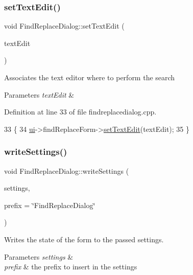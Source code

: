 \subsubsection{\texorpdfstring{set\+Text\+Edit()}{setTextEdit()}}
{\footnotesize\ttfamily void Find\+Replace\+Dialog\+::set\+Text\+Edit (\begin{DoxyParamCaption}\item[{Q\+Text\+Edit $\ast$}]{text\+Edit }\end{DoxyParamCaption})}

Associates the text editor where to perform the search 
\begin{DoxyParams}{Parameters}
{\em text\+Edit} & \\
\hline
\end{DoxyParams}


Definition at line 33 of file findreplacedialog.\+cpp.


\begin{DoxyCode}
33                                                        \{
34     \hyperlink{class_ui_1_1_find_replace_dialog_a29b7e2e415bc683d3dd089b366cccf4a}{ui}->findReplaceForm->\hyperlink{class_ui_1_1_find_replace_dialog_a3d3cd91477be5d6529e9aa3de21958a6}{setTextEdit}(textEdit);
35 \}
\end{DoxyCode}
\mbox{\label{class_ui_1_1_find_replace_dialog_ad9216d8059c559596baa5ddcbda3ec0b}} 
\subsubsection{\texorpdfstring{write\+Settings()}{writeSettings()}}
{\footnotesize\ttfamily void Find\+Replace\+Dialog\+::write\+Settings (\begin{DoxyParamCaption}\item[{Q\+Settings \&}]{settings,  }\item[{const Q\+String \&}]{prefix = {\ttfamily \char`\"{}FindReplaceDialog\char`\"{}} }\end{DoxyParamCaption})\hspace{0.3cm}{\ttfamily [virtual]}}

Writes the state of the form to the passed settings. 
\begin{DoxyParams}{Parameters}
{\em settings} & \\
\hline
{\em prefix} & the prefix to insert in the settings \\
\hline
\end{DoxyParams}


